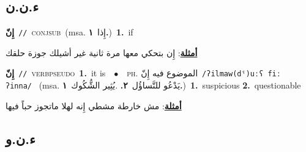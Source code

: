 \documentclass[10pt,a4paper,twoside]{article} %
\begin{document}
\begin{multicols}{2}
\vspace{-3mm}
\subsection*{\color{blue}\foreignlanguage{arabic}{ء.ن.ن}\color{blue}{ (ntws)}} 

{\setlength\topsep{0pt}\textbf{\foreignlanguage{arabic}{إِنّ}}\ {\color{gray}\texttt{//}\color{black}}\ \textsc{conj\textunderscore sub}\ \color{gray}(msa. \foreignlanguage{arabic}{إِذا}~\foreignlanguage{arabic}{\textbf{١.}})\color{black}\ \textbf{1.}~if\  \begin{flushright}\color{gray}\foreignlanguage{arabic}{\textbf{\underline{\foreignlanguage{arabic}{أمثلة}}}: إِن بتحكي معها مرة ثانية غير أشيلك جوزة حلقك}\end{flushright}\color{black}} \vspace{2mm}

{\setlength\topsep{0pt}\textbf{\foreignlanguage{arabic}{إِنّ}}\ {\color{gray}\texttt{//}\color{black}}\ \textsc{verb\textunderscore pseudo}\ \textbf{1.}~it is\ \ $\bullet$\ \ \textsc{ph.} \color{gray} \foreignlanguage{arabic}{الموضوع فيه إِنّ}\color{black}\ {\color{gray}\texttt{/{\sffamily ʔilmaw(dˤ)uːʕ fiː ʔinna}/}\color{black}}\ \color{gray} (msa. \foreignlanguage{arabic}{يَدْعُو للتَّساؤُل}~\foreignlanguage{arabic}{\textbf{٢.}}  .\foreignlanguage{arabic}{يُثِير الشُّكُوك}~\foreignlanguage{arabic}{\textbf{١.}})\color{black}\ \textbf{1.}~suspicious  \textbf{2.}~questionable\  \begin{flushright}\color{gray}\foreignlanguage{arabic}{\textbf{\underline{\foreignlanguage{arabic}{أمثلة}}}: مش خارطة مشطي إِنه لهلا ماتجوز حباً فيها}\end{flushright}\color{black}} \vspace{2mm}

\vspace{-3mm}
\subsection*{\color{blue}\foreignlanguage{arabic}{ء.ن.و}\color{blue}{ (ntws)}} 


\end{multicols}
\end{document}
